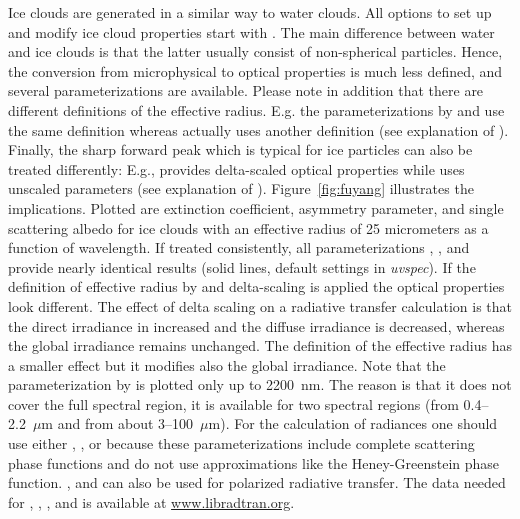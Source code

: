Ice clouds are generated in a similar way to water clouds.  All
options to set up and modify ice cloud properties start with
. The main difference between water and ice clouds is that
the latter usually consist of non-spherical particles. Hence, the
conversion from microphysical to optical properties is much less
defined, and several parameterizations are available. Please note in
addition that there are different definitions of the effective radius.
E.g. the parameterizations by \citet{Key2002} and
\citet{baum05b:_bulk, baum07:_bulk} use the same definition whereas 
\citet{Fu1996} actually
uses another definition (see explanation of
). Finally, the sharp forward peak which is
typical for ice particles can also be treated differently: E.g.,
\citet{Fu1996} provides delta-scaled optical properties while
\citet{Key2002} uses unscaled parameters (see explanation of
). Figure~\ref{fig:fuyang} illustrates the
implications.  Plotted are extinction coefficient, asymmetry
parameter, and single scattering albedo for ice clouds with an
effective radius of 25 micrometers as a function of wavelength. If
treated consistently, all parameterizations \citet{Key2002},
\citet{Fu1996}, and \citet{baum05b:_bulk, baum07:_bulk} provide nearly
identical results (solid 
lines, default settings in {\sl uvspec}).  If the definition of
effective radius by \citet{Fu1996} and delta-scaling is applied the optical
properties look different. The effect of delta scaling on a radiative
transfer calculation is that the direct irradiance in increased and
the diffuse irradiance is decreased, whereas the global irradiance
remains unchanged.  The definition of the effective radius has a
smaller effect but it modifies also the global irradiance.  Note that
the parameterization by \citet{baum05b:_bulk, baum07:_bulk} is plotted only up
to 2200~nm. The reason is that it does not cover the full spectral
region, it is available for two spectral regions (from 0.4--2.2~$\mu$m
and from about 3--100~$\mu$m).
For the calculation of radiances one should use either
, ,  or
 because these parameterizations include complete
scattering phase functions and do not use approximations like the
Heney-Greenstein phase function.  ,  and
 can also be used for polarized radiative transfer. The
data needed for , , , and
 is available at \url{www.libradtran.org}.

